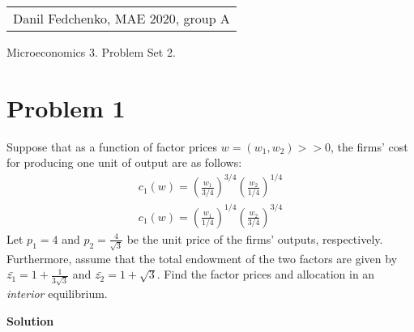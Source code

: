 \documentclass[a4paper]{article}
\begin{document}
	\begin{flushright}
	\begin{tabular}{r}
		Danil Fedchenko, MAE 2020, group A \\
	\end{tabular}
\end{flushright}


\begin{center}
	Microeconomics 3. Problem Set 2.
\end{center}
\section*{Problem 1}
Suppose that as a function of factor prices $w = (w_1, w_2) >> 0$, the firms' cost for producing
one unit of output are as follows:
\begin{align*}
c_1(w) = \left(\frac{w_1}{3/4}\right)^{3/4}\left(\frac{w_2}{1/4}\right)^{1/4}\\
c_1(w) = \left(\frac{w_1}{1/4}\right)^{1/4}\left(\frac{w_2}{3/4}\right)^{3/4}
\end{align*}
Let $p_1 = 4$ and $p_2 = \frac{4}{\sqrt{3}}$ be the unit price of the firms' outputs, respectively. Furthermore, assume that the total endowment of the two factors are given by $\bar{z_1} = 1 + \frac{1}{3\sqrt{3}}$ and $\bar{z_2} = 1+\sqrt{3}$. Find the factor prices and allocation in an \textit{interior} equilibrium.



\textbf{Solution}
\end{document}
